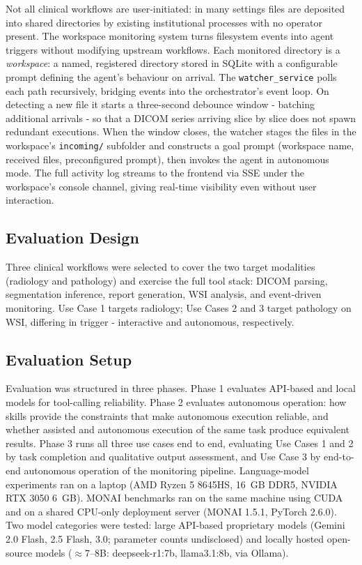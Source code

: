 \documentclass[preprint,12pt]{elsarticle}
\begin{document}
Not all clinical workflows are user-initiated: in many settings files are deposited into shared directories by existing institutional processes with no operator present. The workspace monitoring system turns filesystem events into agent triggers without modifying upstream workflows. Each monitored directory is a \textit{workspace}: a named, registered directory stored in SQLite with a configurable prompt defining the agent's behaviour on arrival. The \texttt{watcher\_service} polls each path recursively, bridging events into the orchestrator's event loop. On detecting a new file it starts a three-second debounce window - batching additional arrivals - so that a DICOM series arriving slice by slice does not spawn redundant executions. When the window closes, the watcher stages the files in the workspace's \texttt{incoming/} subfolder and constructs a goal prompt (workspace name, received files, preconfigured prompt), then invokes the agent in autonomous mode. The full activity log streams to the frontend via SSE under the workspace's console channel, giving real-time visibility even without user interaction.

\subsection{Evaluation Design}
\label{sec:evaluation}

Three clinical workflows were selected to cover the two target modalities (radiology and pathology) and exercise the full tool stack: DICOM parsing, segmentation inference, report generation, WSI analysis, and event-driven monitoring. Use Case 1 targets radiology; Use Cases 2 and 3 target pathology on WSI, differing in trigger - interactive and autonomous, respectively.

\subsection{Evaluation Setup}
Evaluation was structured in three phases. Phase 1 evaluates API-based and local models for tool-calling reliability. Phase 2 evaluates autonomous operation: how skills provide the constraints that make autonomous execution reliable, and whether assisted and autonomous execution of the same task produce equivalent results. Phase 3 runs all three use cases end to end, evaluating Use Cases 1 and 2 by task completion and qualitative output assessment, and Use Case 3 by end-to-end autonomous operation of the monitoring pipeline. Language-model experiments ran on a laptop (AMD Ryzen 5 8645HS, 16~GB DDR5, NVIDIA RTX 3050 6~GB). MONAI benchmarks ran on the same machine using CUDA and on a shared CPU-only deployment server (MONAI 1.5.1, PyTorch 2.6.0). Two model categories were tested: large API-based proprietary models (Gemini 2.0 Flash, 2.5 Flash, 3.0; parameter counts undisclosed) and locally hosted open-source models ($\approx$7--8B: deepseek-r1:7b, llama3.1:8b, via Ollama).
\end{document}
